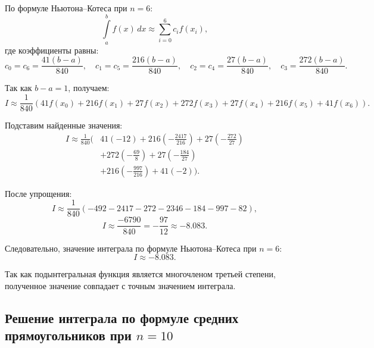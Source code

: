 \documentclass[12pt]{report}
\begin{document}
\begin{flushleft}
		По формуле Ньютона--Котеса при $n=6$:
		\[
		\int\limits_a^b f(x)\,dx \approx \sum_{i=0}^{6} c_i f(x_i),
		\]
		где коэффициенты равны:
		\[
		c_0=c_6=\frac{41(b-a)}{840},\quad
		c_1=c_5=\frac{216(b-a)}{840},\quad
		c_2=c_4=\frac{27(b-a)}{840},\quad
		c_3=\frac{272(b-a)}{840}.
		\]
		
		Так как $b-a=1$, получаем:
		\[
		I \approx \frac{1}{840}\left(41f(x_0)+216f(x_1)+27f(x_2)+272f(x_3)+27f(x_4)+216f(x_5)+41f(x_6)\right).
		\]
		
		Подставим найденные значения:
		\[
		\begin{aligned}
			I \approx \frac{1}{840}\Big(&
			41(-12)+216\left(-\frac{2417}{216}\right)+27\left(-\frac{272}{27}\right) \\
			&+272\left(-\frac{69}{8}\right)+27\left(-\frac{184}{27}\right) \\
			&+216\left(-\frac{997}{216}\right)+41(-2)
			\Big).
		\end{aligned}
		\]
		
		После упрощения:
		\[
		I \approx \frac{1}{840}\left(-492-2417-272-2346-184-997-82\right),
		\]
		\[
		I \approx \frac{-6790}{840}=-\frac{97}{12}\approx -8.083.
		\]
		
		Следовательно, значение интеграла по формуле Ньютона--Котеса при $n=6$:
		\[
		\boxed{I\approx -8.083.}
		\]
		
		Так как подынтегральная функция является многочленом третьей степени, полученное значение совпадает с точным значением интеграла.
	\end{flushleft}
	
	\subsection*{Решение интеграла по формуле средних прямоугольников при $n=10$}
	
\end{document}

